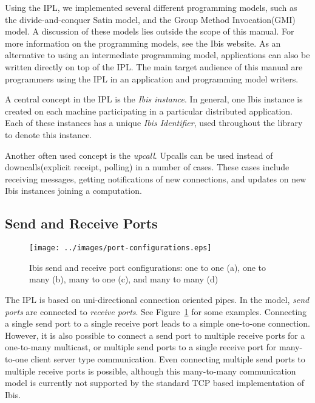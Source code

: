 \documentclass[10pt]{article}
\begin{document}
Using the IPL, we implemented several different programming models, such
as the divide-and-conquer Satin model, and the Group Method
Invocation(GMI) model. A discussion of these models lies outside the
scope of this manual. For more information on the programming models,
see the Ibis website. As an alternative to using an intermediate
programming model, applications can also be written directly on top of
the IPL. The main target audience of this manual are programmers using
the IPL in an application and programming model writers.

A central concept in the IPL is the \emph{Ibis instance}. In general,
one Ibis instance is created on each machine participating in a
particular distributed application. Each of these instances has a unique
\emph{Ibis Identifier}, used throughout the library to denote this
instance.

Another often used concept is the \emph{upcall}. Upcalls can be used
instead of downcalls(explicit receipt, polling) in a number of cases.
These cases include receiving messages, getting notifications of new
connections, and updates on new Ibis instances joining a computation.

\subsection{Send and Receive Ports}


\begin{figure} \centering
\texttt{[image: ../images/port-configurations.eps]}
\caption{\label{ports}Ibis send and receive port configurations: one to one (a), one to many (b), many to one (c), and many to many (d)}
\end{figure}

The IPL is based on uni-directional connection oriented pipes. In the
model, \emph{send ports} are connected to \emph{receive ports}. See
Figure~\ref{ports} for some examples. Connecting a single send port to a
single receive port leads to a simple one-to-one connection. However, it is
also possible to connect a send port to multiple receive ports for a
one-to-many multicast, or multiple send ports to a single receive port
for many-to-one client server type communication. Even connecting
multiple send ports to multiple receive ports is possible, although this
many-to-many communication model is currently not supported by the
standard TCP based implementation of Ibis.
\end{document}
